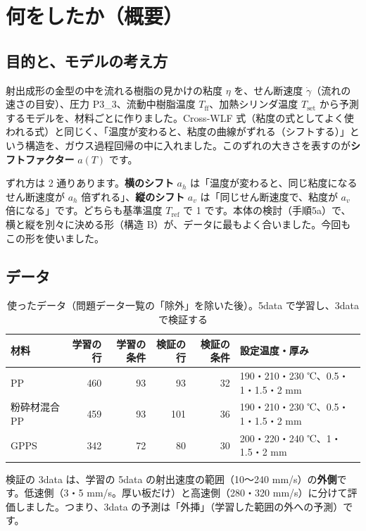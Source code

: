 \documentclass[paper=a4paper,fontsize=10.5pt,line_length=44zw,number_of_lines=38]{jlreq}
\newcommand{\gd}{\dot{\gamma}}
\newcommand{\Tff}{T_{\mathrm{ff}}}
\newcommand{\Tset}{T_{\mathrm{set}}}
\newcommand{\PIII}{P3\_3}
\begin{document}
\section{何をしたか（概要）}

\subsection{目的と、モデルの考え方}
射出成形の金型の中を流れる樹脂の見かけの粘度 $\eta$ を、せん断速度 $\gd$（流れの速さの目安）、圧力 \PIII、流動中樹脂温度 $\Tff$、加熱シリンダ温度 $\Tset$ から予測するモデルを、材料ごとに作りました。Cross-WLF 式（粘度の式としてよく使われる式）と同じく、「温度が変わると、粘度の曲線がずれる（シフトする）」という構造を、ガウス過程回帰の中に入れました。このずれの大きさを表すのが\textbf{シフトファクター} $a(T)$ です。

ずれ方は 2 通りあります。\textbf{横のシフト} $a_h$ は「温度が変わると、同じ粘度になるせん断速度が $a_h$ 倍ずれる」、\textbf{縦のシフト} $a_v$ は「同じせん断速度で、粘度が $a_v$ 倍になる」です。どちらも基準温度 $T_{\mathrm{ref}}$ で 1 です。本体の検討（手順5a）で、横と縦を別々に決める形（構造 B）が、データに最もよく合いました。今回もこの形を使いました。

\subsection{データ}
\begin{table}[H]
\caption{使ったデータ（問題データ一覧の「除外」を除いた後）。5data で学習し、3data で検証する}\label{tab:data}
\small
\begin{tabularx}{\linewidth}{@{}lrrrrX@{}}
\toprule
材料 & 学習の行 & 学習の条件 & 検証の行 & 検証の条件 & 設定温度・厚み \\
\midrule
PP & 460 & 93 & 93 & 32 & 190・210・230 ℃、0.5・1・1.5・2 mm \\
粉砕材混合 PP & 459 & 93 & 101 & 36 & 190・210・230 ℃、0.5・1・1.5・2 mm \\
GPPS & 342 & 72 & 80 & 30 & 200・220・240 ℃、1・1.5・2 mm \\
\bottomrule
\end{tabularx}
\end{table}
検証の 3data は、学習の 5data の射出速度の範囲（10〜240 mm/s）の\textbf{外側}です。低速側（3・5 mm/s。厚い板だけ）と高速側（280・320 mm/s）に分けて評価しました。つまり、3data の予測は「外挿」（学習した範囲の外への予測）です。
\end{document}
